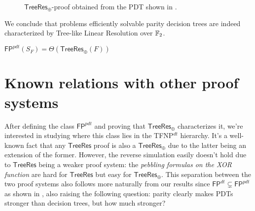 \begin{figure}[H]
    \centering
    

    \caption{$\mathsf{TreeRes}_\oplus$-proof obtained from the PDT shown in .}
\end{figure}

We conclude that problems efficiently solvable parity decision trees are indeed characterized by Tree-like Linear Resolution over $\mathbb{F}_2$.

\begin{theorem}
    $\mathsf{FP}^{pdt}(S_F) = \Theta(\mathsf{TreeRes}_\oplus(F))$
\end{theorem}

\section{Known relations with other proof systems}

After defining the class $\mathsf{FP}^{pdt}$ and proving that $\mathsf{TreeRes}_\oplus$ characterizes it, we're interested in studying where this class lies in the \textsf{TFNP}$^{dt}$ hierarchy. It's a well-known fact that any $\mathsf{TreeRes}$ proof is also a $\mathsf{TreeRes}_\oplus$ due to the latter being an extension of the former. However, the reverse simulation easily doesn't hold due to $\mathsf{TreeRes}$ being a weaker proof system: the \textit{pebbling formulas on the XOR function} are hard for $\mathsf{TreeRes}$ but easy for $\mathsf{TreeRes}_\oplus$. This separation between the two proof systems also follows more naturally from our results since $\mathsf{FP}^{dt} \subsetneq \mathsf{FP}^{pdt}$ as shown in , also raising the following question: parity clearly makes PDTs stronger than decision trees, but how much stronger?

